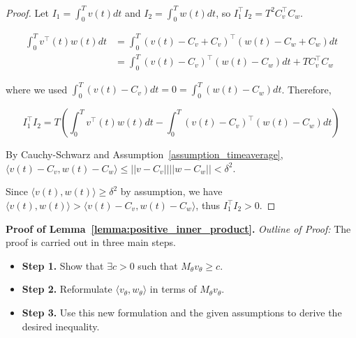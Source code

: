 \documentclass[letterpaper, 10 pt, conference]{ieeeconf}  %
\begin{document}
\begin{proof} 
Let $I_1 = \int_{0}^{T}v(t)dt$ and $I_2 = \int_{0}^{T}w(t)dt$, so $I_{1}^{\top}I_2 = T^2 C_{v}^{\top}C_{w}$. 

\begin{small}
\begin{align*}
\int_{0}^{T}v^{\top}(t)w(t)dt &= \int_{0}^{T}(v(t) - C_v + C_v)^{\top}(w(t) - C_w + C_w)dt \\
&= \int_{0}^{T}(v(t) - C_v)^{\top}(w(t) - C_w)dt + TC_{v}^{\top}C_{w}
\end{align*}
\end{small}
where we used $\int_0^T (v(t) - C_v) dt = 0 = \int_0^T (w(t) - C_w) dt$. Therefore,
\begin{small}
\begin{equation}
I_{1}^{\top}I_2 = T\left(\int_{0}^{T}v^{\top}(t)w(t)dt - \int_{0}^{T}(v(t) -C_v)^{\top}(w(t)-C_w)dt\right)
\label{eq:inner_product_lemma4}
\end{equation}
\end{small}
By Cauchy-Schwarz and Assumption~\ref{assumption_timeaverage}, 
$\langle v(t) - C_v, w(t) - C_w \rangle \leq ||v-C_v||||w-C_w|| < \delta^2$. 

Since $\langle v(t),w(t) \rangle \geq \delta^2$ by assumption, we have $\langle v(t),w(t) \rangle > \langle v(t) - C_v,w(t) - C_w \rangle$, thus $I_{1}^{\top}I_2 > 0$.
\end{proof}

\noindent \textbf{Proof of Lemma~\ref{lemma:positive_inner_product}.}
\noindent
\textit{}
\textit{Outline of Proof:} The proof is carried out in three main steps.
\begin{itemize}
    \item[] \textbf{Step 1.} Show that $\exists c > 0$ such that $M_{\theta} v_{\theta} \geq c$.
    \item[] \textbf{Step 2.} Reformulate $\langle v_{\theta}, w_{\theta}\rangle$ in terms of $M_{\theta} v_{\theta}$.
    \item[] \textbf{Step 3.} Use this new formulation and the given assumptions to derive the desired inequality. 
\end{itemize}
\end{document}
